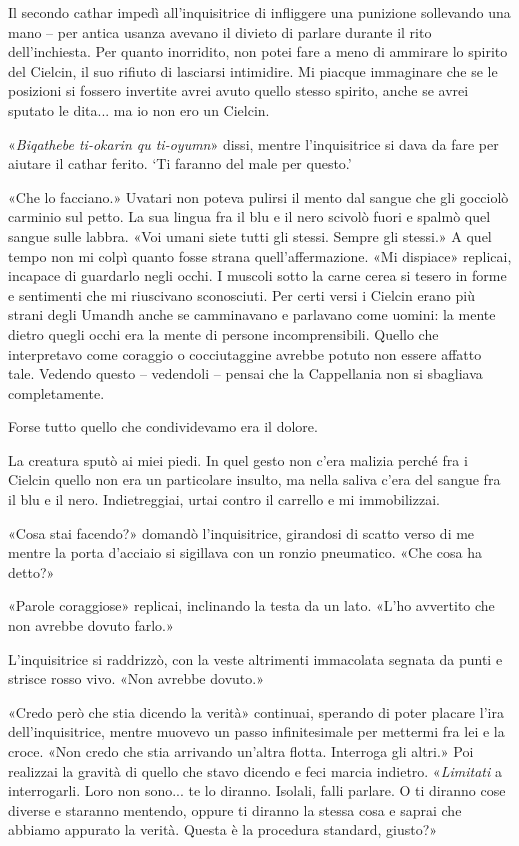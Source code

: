 Il secondo cathar impedì all'inquisitrice di infliggere una punizione
sollevando una mano -- per antica usanza avevano il divieto di parlare
durante il rito dell'inchiesta. Per quanto inorridito, non potei fare a
meno di ammirare lo spirito del Cielcin, il suo rifiuto di lasciarsi
intimidire. Mi piacque immaginare che se le posizioni si fossero
invertite avrei avuto quello stesso spirito, anche se avrei sputato le
dita... ma io non ero un Cielcin.

«\emph{Biqathebe ti-okarin qu ti-oyumn}» dissi, mentre l'inquisitrice si
dava da fare per aiutare il cathar ferito. `Ti faranno del male per
questo.'

«Che lo facciano.» Uvatari non poteva pulirsi il mento dal sangue che
gli gocciolò carminio sul petto. La sua lingua fra il blu e il nero
scivolò fuori e spalmò quel sangue sulle labbra. «Voi umani siete tutti
gli stessi. Sempre gli stessi.» A quel tempo non mi colpì quanto fosse
strana quell'affermazione. «Mi dispiace» replicai, incapace di guardarlo
negli occhi. I muscoli sotto la carne cerea si tesero in forme e
sentimenti che mi riuscivano sconosciuti. Per certi versi i Cielcin
erano più strani degli Umandh anche se camminavano e parlavano come
uomini: la mente dietro quegli occhi era la mente di persone
incomprensibili. Quello che interpretavo come coraggio o cocciutaggine
avrebbe potuto non essere affatto tale. Vedendo questo -- vedendoli --
pensai che la Cappellania non si sbagliava completamente.

Forse tutto quello che condividevamo era il dolore.

La creatura sputò ai miei piedi. In quel gesto non c'era malizia perché
fra i Cielcin quello non era un particolare insulto, ma nella saliva
c'era del sangue fra il blu e il nero. Indietreggiai, urtai contro il
carrello e mi immobilizzai.

«Cosa stai facendo?» domandò l'inquisitrice, girandosi di scatto verso
di me mentre la porta d'acciaio si sigillava con un ronzio pneumatico.
«Che cosa ha detto?»

«Parole coraggiose» replicai, inclinando la testa da un lato. «L'ho
avvertito che non avrebbe dovuto farlo.»

L'inquisitrice si raddrizzò, con la veste altrimenti immacolata segnata
da punti e strisce rosso vivo. «Non avrebbe dovuto.»

«Credo però che stia dicendo la verità» continuai, sperando di poter
placare l'ira dell'inquisitrice, mentre muovevo un passo infinitesimale
per mettermi fra lei e la croce. «Non credo che stia arrivando un'altra
flotta. Interroga gli altri.» Poi realizzai la gravità di quello che
stavo dicendo e feci marcia indietro. «\emph{Limitati} a {interrogarli}.
Loro non sono... te lo diranno. Isolali, falli parlare. O ti diranno
cose diverse e staranno mentendo, oppure ti diranno la stessa cosa e
saprai che abbiamo appurato la verità. Questa è la procedura standard,
giusto?»

